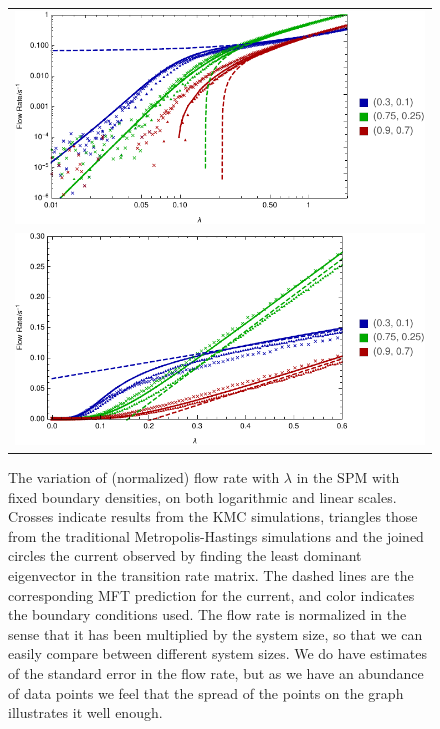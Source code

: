 \documentclass[
reprint, amsmath,amssymb,
]{revtex4-1}
\begin{document}
\begin{figure}[h!]
\vspace{0em}
\begin{center}
 \begin{tabular}{c}
    \includegraphics[width=1\linewidth]{allData} \\
    \includegraphics[width=1\linewidth]{allDataLinear}
    \end{tabular}
\end{center}
\caption{\label{fig:lambdaScans} The variation of (normalized) flow rate with $\lambda$ in the SPM with fixed boundary densities, on both logarithmic and linear scales.
Crosses indicate results from the KMC simulations, triangles those from the traditional
Metropolis-Hastings simulations and the joined circles the current observed by finding the least dominant eigenvector in the transition rate matrix. The dashed lines are the corresponding MFT prediction for the current,
and color indicates the boundary conditions used. The flow rate is normalized in the sense that it has been multiplied by the system size, so that we can easily compare between different system sizes.
We do have estimates of the standard error in the flow rate, but as we have an abundance of data points we feel that the spread of the points on the graph illustrates it well enough.
}
    \vspace{0em}
\end{figure}
\end{document}
